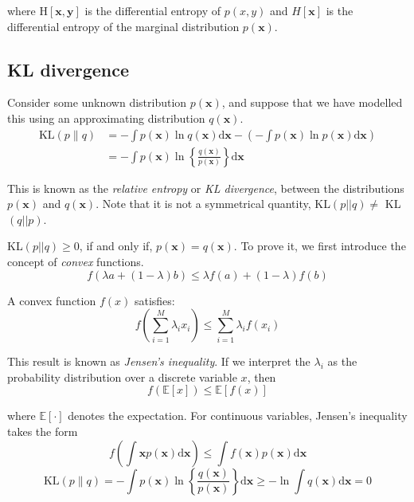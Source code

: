 \documentclass[5p,sort&compress]{elsarticle}
\begin{document}
where $\mathrm{H}[\mathbf{x}, \mathbf{y}]$ is the differential entropy of $p(x,y)$ and $H[\mathbf{x}]$ is the differential entropy of the marginal distribution $p(\mathbf{x})$.


\subsection{KL divergence}

Consider some unknown distribution $p(\mathbf{x})$, and suppose that we have modelled this using an approximating distribution $q(\mathbf{x})$.
\begin{equation}
\begin{aligned} \mathrm{KL}(p \| q) &=-\int p(\mathbf{x}) \ln q(\mathbf{x}) \mathrm{d} \mathbf{x}-\left(-\int p(\mathbf{x}) \ln p(\mathbf{x}) \mathrm{d} \mathbf{x}\right) \\ &=-\int p(\mathbf{x}) \ln \left\{\frac{q(\mathbf{x})}{p(\mathbf{x})}\right\} \mathrm{d} \mathbf{x} \end{aligned}
\end{equation}

This is known as the \textit{relative entropy} or \textit{KL divergence}, between the distributions $p(\mathbf{x})$ and $q(\mathbf{x})$. Note that it is not a symmetrical quantity, KL$(p||q) \neq$  KL$(q||p)$. 

KL$(p||q) \geq 0$, if and only if, $p(\mathbf{x}) = q(\mathbf{x})$. To prove it, we first introduce the concept of \textit{convex} functions.
\begin{equation}
f(\lambda a+(1-\lambda) b) \leqslant \lambda f(a)+(1-\lambda) f(b)
\end{equation}

A convex function $f(x)$ satisfies:
\begin{equation}
f\left(\sum_{i=1}^{M} \lambda_{i} x_{i}\right) \leqslant \sum_{i=1}^{M} \lambda_{i} f\left(x_{i}\right)
\end{equation}

This result is known as \textit{Jensen's inequality}. If we interpret the $\lambda_i$ as the probability distribution over a discrete variable $x$, then
\begin{equation}
f(\mathbb{E}[x]) \leqslant \mathbb{E}[f(x)]
\end{equation}

where $\mathbb{E}[\cdot]$ denotes the expectation. For continuous variables, Jensen's inequality takes the form
\begin{equation}
f\left(\int \mathbf{x} p(\mathbf{x}) \mathrm{d} \mathbf{x}\right) \leqslant \int f(\mathbf{x}) p(\mathbf{x}) \mathrm{d} \mathbf{x}
\end{equation}
\begin{equation}
\mathrm{KL}(p \| q)=-\int p(\mathbf{x}) \ln \left\{\frac{q(\mathbf{x})}{p(\mathbf{x})}\right\} \mathrm{d} \mathbf{x} \geqslant-\ln \int q(\mathbf{x}) \mathrm{d} \mathbf{x}=0
\end{equation}
\end{document}
